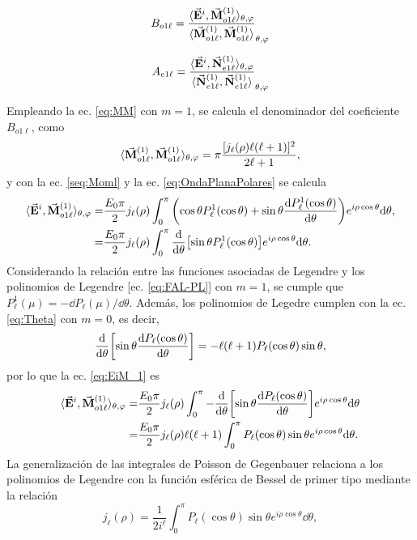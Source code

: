 \documentclass[letterpaper,11pt] {article}
\newcommand{\beqhalf}{\noindent \begin{minipage}[c]{.5\linewidth} \begin{equation}}
\newcommand{\eeqhalf}{\end{equation} \end{minipage} }
\newcommand{\eqhalf}[1]{\beqhalf #1 \eeqhalf}
\begin{document}
	\eqhalf{B_{o1\ell} = \frac{\langle \va{E}^i, \va{M}_{o1\ell}^{(1)}  \rangle_{\theta,\varphi}}
						{\langle \va{M}_{o1\ell}^{(1)} ,\va{M}_{o1\ell}^{(1)} \rangle}_{\theta,\varphi}\notag}
	\eqhalf{A_{e1\ell} = \frac{\langle \va{E}^i, \va{N}_{e1\ell}^{(1)} \rangle_{\theta,\varphi}}
						{\langle \va{N}_{e1\ell}^{(1)},\va{N}_{e1\ell}^{(1)} \rangle}_{\theta,\varphi}\notag}
Empleando la ec. \eqref{eq:MM} con $m=1$, se calcula el denominador del coeficiente $B_{o1\ell}$, como
	\begin{equation}
			\langle \va{M}_{o1\ell}^{(1)} ,\va{M}_{o1\ell}^{(1)} \rangle_{\theta,\varphi} = \pi \frac{[j_\ell(\rho) \ell(\ell+1)]^2}{2\ell+1},
			\label{eq:MMm=1}
	\end{equation}
y con la ec. \eqref{seq:Moml} y la ec. \eqref{eq:OndaPlanaPolares} se calcula
	\begin{align}
		\langle \va{E}^i, \va{M}_{o1\ell}^{(1)}  \rangle_{\theta,\varphi} 
			=& \frac{E_0 \pi}{2} j_\ell(\rho) \int_0^\pi \qty(\cos\theta P_\ell^1(\cos\theta)+\sin\theta \dv{P_\ell^1(\cos\theta)}{\theta})e^{i\rho\cos\theta}\dd\theta,\notag\\
			=& \frac{E_0 \pi}{2} j_\ell(\rho) \int_0^\pi \dv{\theta}\qty[\sin\theta P_\ell^1(\cos\theta)]e^{i\rho\cos\theta}\dd\theta. \label{eq:EiM_1}
	\end{align}
Considerando la relación entre las funciones asociadas de Legendre y los polinomios de Legendre [ec. \eqref{eq:FAL-PL}] con $m=1$, se cumple que $P_\ell^1(\mu)=-\dd P_\ell(\mu)/\dd\theta$. Además, los polinomios de Legedre cumplen con la ec. \eqref{eq:Theta} con $m=0$, es decir,
	\begin{equation*}
	\dv{\theta}\qty[\sin\theta \dv{P_\ell(\cos\theta)}{\theta}] = - \ell(\ell+1)P_\ell(\cos\theta) \sin\theta,
	\end{equation*}
por lo que la ec. \eqref{eq:EiM_1} es
	\begin{align}
	\langle \va{E}^i, \va{M}_{o1\ell}^{(1)}  \rangle_{\theta,\varphi}
			 = & \frac{E_0 \pi}{2} j_\ell(\rho) \int_0^\pi -\dv{\theta}\qty[\sin\theta \dv{P_\ell(\cos\theta)}{\theta}]e^{i\rho\cos\theta}\dd\theta\notag\\
			  = & \frac{E_0 \pi}{2} j_\ell(\rho) \ell(\ell+1)\int_0^\pi P_\ell(\cos\theta)\sin\theta e^{i\rho\cos\theta}\dd\theta.\label{eq:EiM_2}
	\end{align}
La generalización de las integrales de Poisson de Gegenbauer  relaciona a los polinomios de Legendre con la función esférica de Bessel de primer tipo mediante la relación
	\begin{equation*}
	j_\ell(\rho) = \frac{1}{2i^\ell}\int_0^\pi P_\ell(\cos\theta)\sin\theta e^{i\rho\cos\theta}\dd\theta,
	\end{equation*}
\end{document}
